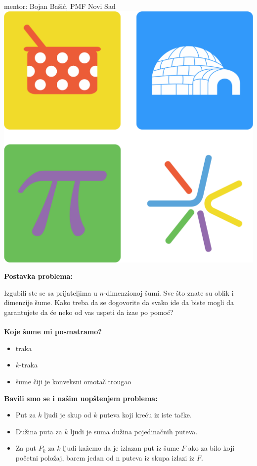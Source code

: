 \documentclass[b1paper,portrait]{template/baposter}
\begin{document}
\begin{poster}
{{		   	mentor: Bojan Ba\v si\' c, PMF Novi Sad
		}
}
{\includegraphics[scale=0.25]{MatLogo}}




{ 
	\textbf{Postavka problema:}
	
 	Izgubili ste se sa prijateljima u $n$-dimenzionoj \v sumi.
 	Sve \v sto znate su oblik i dimenzije \v sume.
 	Kako treba da se dogovorite da svako ide da biste mogli da garantujete da \' ce neko od vas uspeti da iza\dj e po pomo\' c?
 	\\
 	\\
 	\textbf{Koje \v sume mi posmatramo?}
 	\begin{itemize}
 		\item traka
 		\item $k$-traka
 		\item \v sume \v ciji je konveksni omota\v c trougao
 	\end{itemize}
	\textbf{Bavili smo se i na\v sim uop\v stenjem problema:}
	\begin{itemize}
		\item Put za $k$ ljudi je skup od $k$ puteva koji kre\' cu iz iste ta\v cke.
		\item Du\v zina puta za $k$ ljudi je suma du\v zina pojedina\v cnih puteva.
		\item Za put $P_k$ za $k$ ljudi ka\v zemo da je izlazan put iz \v sume $F$ ako za bilo koji po\v cetni polo\v zaj, barem jedan od n puteva iz skupa izlazi iz $F$.
	\end{itemize}
   	\vspace{0.15cm}
}


\end{poster}
\end{document}
